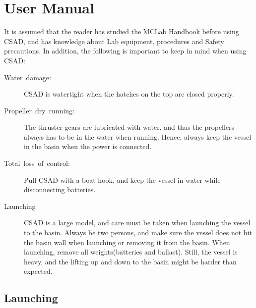 \part{User Manual}\label{part2}
It is assumed that the reader has studied the MCLab Handbook before using CSAD, and has knowledge about Lab equipment, procedures and Safety precautions. In addition, the following is important to keep in mind when using CSAD:
\begin{description}
	\item [{Water~damage:}] CSAD is watertight when the hatches on the top are closed properly.  
	\item [{Propeller~dry~running:}] The thruster gears are lubricated with water, and thus the propellers always has to be in the water when running. Hence, always keep the vessel in the basin when the power is connected. 
	\item [{Total~loss~of~control:}] Pull CSAD with a boat hook, and keep the vessel in water while disconnecting batteries.
	\item [{Launching}] CSAD is a large model, and care must be taken when launching the vessel to the basin. Always be two persons, and make sure the vessel does not hit the basin wall when launching or removing it from the basin. When launching, remove all weights(batteries and ballast). Still, the vessel is heavy, and the lifting up and down to the basin might be harder than expected. 
\end{description}
\chapter{Launching}

